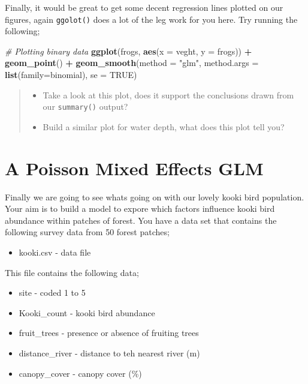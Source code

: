 \documentclass[
]{book}
\newenvironment{Shaded}{\begin{snugshade}}{\end{snugshade}}
\newcommand{\AttributeTok}[1]{\textcolor[rgb]{0.13,0.29,0.53}{#1}}
\newcommand{\CommentTok}[1]{\textcolor[rgb]{0.56,0.35,0.01}{\textit{#1}}}
\newcommand{\ConstantTok}[1]{\textcolor[rgb]{0.56,0.35,0.01}{#1}}
\newcommand{\FunctionTok}[1]{\textcolor[rgb]{0.13,0.29,0.53}{\textbf{#1}}}
\newcommand{\NormalTok}[1]{#1}
\newcommand{\SpecialCharTok}[1]{\textcolor[rgb]{0.81,0.36,0.00}{\textbf{#1}}}
\newcommand{\StringTok}[1]{\textcolor[rgb]{0.31,0.60,0.02}{#1}}
\providecommand{\tightlist}{%
  \setlength{\itemsep}{0pt}\setlength{\parskip}{0pt}}
\begin{document}
Finally, it would be great to get some decent regression lines plotted on our figures, again \texttt{ggolot()} does a lot of the leg work for you here. Try running the following;

\begin{Shaded}
\begin{Highlighting}[]
\CommentTok{\# Plotting binary data}
\FunctionTok{ggplot}\NormalTok{(frogs, }\FunctionTok{aes}\NormalTok{(}\AttributeTok{x =}\NormalTok{ veght, }\AttributeTok{y =}\NormalTok{ frogs)) }\SpecialCharTok{+} 
  \FunctionTok{geom\_point}\NormalTok{() }\SpecialCharTok{+}
  \FunctionTok{geom\_smooth}\NormalTok{(}\AttributeTok{method =} \StringTok{"glm"}\NormalTok{, }\AttributeTok{method.args =} \FunctionTok{list}\NormalTok{(}\AttributeTok{family=}\NormalTok{binomial), }\AttributeTok{se =} \ConstantTok{TRUE}\NormalTok{)}
\end{Highlighting}
\end{Shaded}

\begin{quote}
\begin{itemize}
\tightlist
\item
  Take a look at this plot, does it support the conclusions drawn from our \texttt{summary()} output?
\item
  Build a similar plot for water depth, what does this plot tell you?
\end{itemize}
\end{quote}

\hypertarget{a-poisson-mixed-effects-glm}{%
\section{A Poisson Mixed Effects GLM}\label{a-poisson-mixed-effects-glm}}

Finally we are going to see whats going on with our lovely kooki bird population. Your aim is to build a model to expore which factors influence kooki bird abundance within patches of forest. You have a data set that contains the following survey data from 50 forest patches;

\begin{itemize}
\tightlist
\item
  kooki.csv - data file
\end{itemize}

This file contains the following data;

\begin{itemize}
\tightlist
\item
  site - coded 1 to 5
\item
  Kooki\_count - kooki bird abundance
\item
  fruit\_trees - presence or absence of fruiting trees
\item
  distance\_river - distance to teh nearest river (m)
\item
  canopy\_cover - canopy cover (\%)
\end{itemize}
\end{document}
